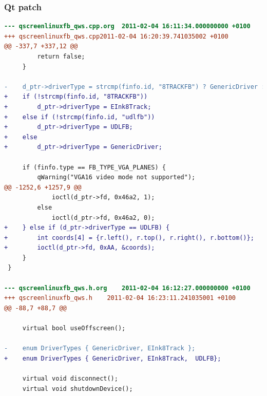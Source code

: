 \documentclass{beamer}
\begin{document}
	\begin{frame}[containsverbatim]
		\frametitle{Qt patch}
		\begin{lstlisting}[language=diff, basicstyle=\scriptsize]
--- qscreenlinuxfb_qws.cpp.org	2011-02-04 16:11:34.000000000 +0100
+++ qscreenlinuxfb_qws.cpp2011-02-04 16:20:39.741035002 +0100
@@ -337,7 +337,12 @@
         return false;
     }
 
-    d_ptr->driverType = strcmp(finfo.id, "8TRACKFB") ? GenericDriver : EInk8Track;
+    if (!strcmp(finfo.id, "8TRACKFB"))
+        d_ptr->driverType = EInk8Track;
+    else if (!strcmp(finfo.id, "udlfb"))
+        d_ptr->driverType = UDLFB;
+    else
+        d_ptr->driverType = GenericDriver;
 
     if (finfo.type == FB_TYPE_VGA_PLANES) {
         qWarning("VGA16 video mode not supported");
@@ -1252,6 +1257,9 @@
             ioctl(d_ptr->fd, 0x46a2, 1);
         else
             ioctl(d_ptr->fd, 0x46a2, 0);
+    } else if (d_ptr->driverType == UDLFB) {
+        int coords[4] = {r.left(), r.top(), r.right(), r.bottom()};
+        ioctl(d_ptr->fd, 0xAA, &coords);
     }
 }
 
--- qscreenlinuxfb_qws.h.org	2011-02-04 16:12:27.000000000 +0100
+++ qscreenlinuxfb_qws.h	2011-02-04 16:23:11.241035001 +0100
@@ -88,7 +88,7 @@
 
     virtual bool useOffscreen();
 
-    enum DriverTypes { GenericDriver, EInk8Track };
+    enum DriverTypes { GenericDriver, EInk8Track,  UDLFB};
 
     virtual void disconnect();
     virtual void shutdownDevice();	
		\end{lstlisting}
	\end{frame}
\end{document}
